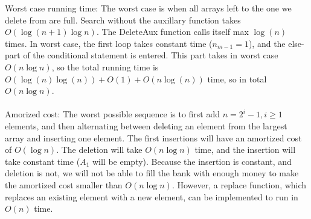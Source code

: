 \documentclass[koma,a4paper]{article}
\begin{document}
Worst case running time: The worst case is when all arrays left to the one we delete from are full. Search without the auxillary function takes $O(\log(n+1) \log n)$. The DeleteAux function calls itself max $\log(n)$ times. In worst case, the first loop takes constant time ($n_{m-1} = 1$), and the else-part of the conditional statement is entered. This part takes in worst case $O(n \log n)$, so the total running time is $O(\log(n) \log(n)) + O(1) + O(n \log(n))$ time, so in total $O(n \log n)$.
\\\\
Amorized cost: The worst possible sequence is to first add $n = 2^i-1, i \geq 1$ elements, and then alternating between deleting an element from the largest array and inserting one element. The first insertions will have an amortized cost of $O(\log n)$. The deletion will take $O(n \log n)$ time, and the insertion will take constant time ($A_1$ will be empty). Because the insertion is constant, and deletion is not, we will not be able to fill the bank with enough money to make the amortized cost smaller than $O(n \log n)$. However, a replace function, which replaces an existing element with a new element, can be implemented to run in $O(n)$ time.
\end{document}
